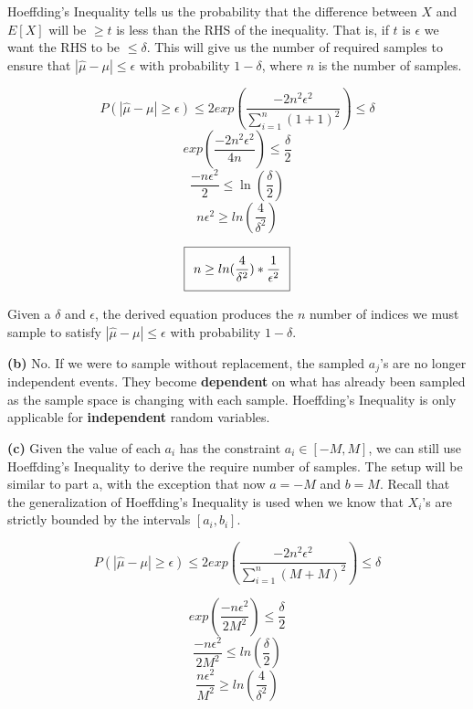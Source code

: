 \documentclass[11pt]{article}
\renewcommand\part[1]{\vspace{.10in}\textbf{(#1)}}
\begin{document}
Hoeffding's Inequality tells us the probability that the difference between $X$ and $E[X]$ will be $\geq t$ is less than the RHS of the inequality. That is, if $t$ is $\epsilon$ we want the RHS to be $\leq \delta$. This will give us the number of required samples to ensure that $|\hat \mu - \mu| \leq \epsilon$ with probability $1 - \delta$, where $n$ is the number of samples.

$$P(|\hat \mu - \mu| \geq \epsilon) \leq 2 exp(\frac{-2n^2\epsilon^2}{\sum_{i = 1}^n (1 + 1)^2}) \leq \delta$$
$$exp(\frac{-2n^2\epsilon^2}{4n}) \leq \frac{\delta}{2}$$
$$\frac{-n\epsilon^2}{2} \leq \ln(\frac{\delta}{2})$$
$$n\epsilon^2 \geq ln(\frac{4}{\delta^2})$$

\begin{equation}
\setlength\fboxsep{0.25cm}
\setlength\fboxrule{0.4pt}
\boxed{n \geq ln(\frac{4}{\delta^2}) * \frac{1}{\epsilon^2}}
\end{equation}

Given a $\delta$ and $\epsilon$, the derived equation produces the $n$ number of indices we must sample to satisfy $|\hat \mu - \mu| \leq \epsilon$ with probability $1 - \delta$.

\part{b} No. If we were to sample without replacement, the sampled $a_j$'s are no longer independent events. They become \textbf{dependent} on what has already been sampled as the sample space is changing with each sample. Hoeffding's Inequality is only applicable for \textbf{independent} random variables.

\part{c} Given the value of each $a_i$ has the constraint $a_i \in [-M, M]$, we can still use Hoeffding's Inequality to derive the require number of samples. The setup will be similar to part a, with the exception that now $a = -M$ and $b = M$. Recall that the generalization of Hoeffding's Inequality is used when we know that $X_i$'s are strictly bounded by the intervals $[a_i, b_i]$.

$$P(|\hat \mu - \mu| \geq \epsilon) \leq 2 exp(\frac{-2n^2\epsilon^2}{\sum_{i = 1}^n (M + M)^2}) \leq \delta$$

$$exp(\frac{-n\epsilon^2}{2M^2}) \leq \frac{\delta}{2}$$
$$\frac{-n\epsilon^2}{2M^2} \leq ln(\frac{\delta}{2})$$
$$\frac{n\epsilon^2}{M^2} \geq ln(\frac{4}{\delta^2})$$
\end{document}
